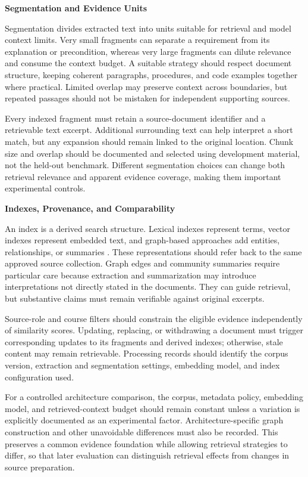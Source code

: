\documentclass[12pt,a4paper]{report}
\numberwithin{equation}{chapter}
\begin{document}
\par\medskip
\textbf{Segmentation and Evidence Units}

Segmentation divides extracted text into units suitable for retrieval and model context limits. Very small fragments can separate a requirement from its explanation or precondition, whereas very large fragments can dilute relevance and consume the context budget. A suitable strategy should respect document structure, keeping coherent paragraphs, procedures, and code examples together where practical. Limited overlap may preserve context across boundaries, but repeated passages should not be mistaken for independent supporting sources.

Every indexed fragment must retain a source-document identifier and a retrievable text excerpt. Additional surrounding text can help interpret a short match, but any expansion should remain linked to the original location. Chunk size and overlap should be documented and selected using development material, not the held-out benchmark. Different segmentation choices can change both retrieval relevance and apparent evidence coverage, making them important experimental controls.

\par\medskip
\textbf{Indexes, Provenance, and Comparability}

An index is a derived search structure. Lexical indexes represent terms, vector indexes represent embedded text, and graph-based approaches add entities, relationships, or summaries \cite{Guo2024,Edge2024}. These representations should refer back to the same approved source collection. Graph edges and community summaries require particular care because extraction and summarization may introduce interpretations not directly stated in the documents. They can guide retrieval, but substantive claims must remain verifiable against original excerpts.

Source-role and course filters should constrain the eligible evidence independently of similarity scores. Updating, replacing, or withdrawing a document must trigger corresponding updates to its fragments and derived indexes; otherwise, stale content may remain retrievable. Processing records should identify the corpus version, extraction and segmentation settings, embedding model, and index configuration used.

For a controlled architecture comparison, the corpus, metadata policy, embedding model, and retrieved-context budget should remain constant unless a variation is explicitly documented as an experimental factor. Architecture-specific graph construction and other unavoidable differences must also be recorded. This preserves a common evidence foundation while allowing retrieval strategies to differ, so that later evaluation can distinguish retrieval effects from changes in source preparation.
\end{document}
